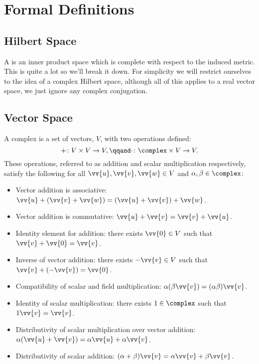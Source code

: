\chapter{Formal Definitions}
    \section{Hilbert Space}
    A  is an inner product space which is complete with respect to the induced metric.
    This is quite a lot so we'll break it down.
    For simplicity we will restrict ourselves to the idea of a complex Hilbert space, although all of this applies to a real vector space, we just ignore any complex conjugation.
    
    \section{Vector Space}
    A complex  is a set of vectors, \(V\), with two operations defined:
    \begin{equation}
        +\colon V\times V \to V, \qqand \cdot\colon \complex\times V \to V.
    \end{equation}
    These operations, referred to as addition and scalar multiplication respectively, satisfy the following for all \(\vv{u}, \vv{v}, \vv{w}\in V\) and \(\alpha, \beta\in\complex\):
    \begin{itemize}
        \item Vector addition is associative: \(\vv{u} + (\vv{v} + \vv{w}) = (\vv{u} + \vv{v}) + \vv{w}\).
        \item Vector addition is commutative: \(\vv{u} + \vv{v} = \vv{v} + \vv{u}\).
        \item Identity element for addition: there exists \(\vv{0} \in V\) such that \(\vv{v} + \vv{0} = \vv{v}\).
        \item Inverse of vector addition: there exists \(-\vv{v}\in V\) such that \(\vv{v} + (-\vv{v}) = \vv{0}\).
        \item Compatibility of scalar and field multiplication: \(\alpha(\beta\vv{v}) = (\alpha\beta)\vv{v}\).
        \item Identity of scalar multiplication: there exists \(1 \in \complex\) such that \(1\vv{v} = \vv{v}\).
        \item Distributivity of scalar multiplication over vector addition: \(\alpha(\vv{u} + \vv{v}) = \alpha\vv{u} + \alpha\vv{v}\).
        \item Distributivity of scalar addition: \((\alpha + \beta)\vv{v} = \alpha\vv{v} + \beta\vv{v}\).
    \end{itemize}

